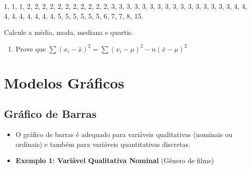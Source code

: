\documentclass[
]{book}
\providecommand{\tightlist}{%
  \setlength{\itemsep}{0pt}\setlength{\parskip}{0pt}}
\begin{document}
1, 1, 1, 2, 2, 2, 2, 2, 2, 2, 2, 2, 2, 2, 3, 3, 3, 3, 3, 3, 3, 3, 3, 3, 3, 3, 3, 3, 3, 3, 4, 4, 4, 4, 4, 4, 4, 4, 4, 5, 5, 5, 5, 5, 5, 6, 7, 7, 8, 15.

Calcule a média, moda, mediana e quartis.

\begin{enumerate}
\def\labelenumi{\arabic{enumi}.}
\setcounter{enumi}{2}
\tightlist
\item
  Prove que \(\sum (x_i - \bar{x})^2 = \sum (x_i - \mu)^2 - n(\bar{x} - \mu)^2\)
\end{enumerate}

\chapter{Modelos Gráficos}\label{modelos_graficos6}

\section{Gráfico de Barras}\label{gruxe1fico-de-barras}

\begin{itemize}
\item
  O gráfico de barras é adequado para variáveis qualitativas (nominais ou ordinais) e também para variáveis quantitativas discretas.
\item
  \textbf{Exemplo 1: Variável Qualitativa Nominal} (Gênero de filme)
\end{itemize}

\begin{table}[!h]
\centering\begingroup\fontsize{8}{10}\selectfont

\endgroup{}
\end{table}
\end{document}
